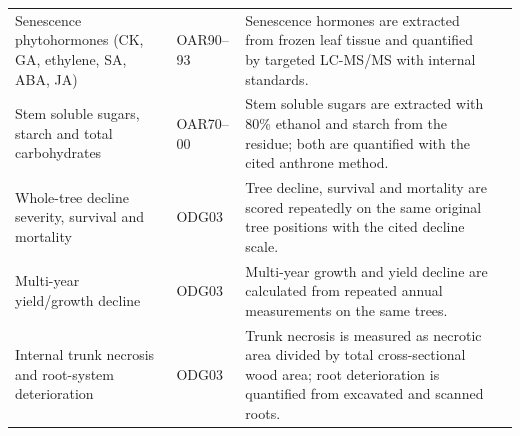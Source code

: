 \begin{landscape}
\begin{longtable}{>{\RaggedRight\arraybackslash}p{5.1cm} >{\RaggedRight\arraybackslash}p{2.3cm} >{\RaggedRight\arraybackslash}p{16.7cm} >{\RaggedRight\arraybackslash}p{2.4cm}}
Senescence phytohormones (CK, GA, ethylene, SA, ABA, JA) &
OAR90--93 &
Senescence hormones are extracted from frozen leaf tissue and quantified by targeted LC-MS/MS with internal standards. &
\citep{milyaev2022}\\

Stem soluble sugars, starch and total carbohydrates &
OAR70--00 &
Stem soluble sugars are extracted with 80\% ethanol and starch from the residue; both are quantified with the cited anthrone method. &
\citep{sivaci2006,sydney_anthrone}\\

Whole-tree decline severity, survival and mortality &
ODG03 &
Tree decline, survival and mortality are scored repeatedly on the same original tree positions with the cited decline scale. &
\citep{wunsch2024,lawrence2025}\\

Multi-year yield/growth decline &
ODG03 &
Multi-year growth and yield decline are calculated from repeated annual measurements on the same trees. &
\citep{plavcova2022,lawrence2025}\\

Internal trunk necrosis and root-system deterioration &
ODG03 &
Trunk necrosis is measured as necrotic area divided by total cross-sectional wood area; root deterioration is quantified from excavated and scanned roots. &
\citep{serrano2023}\\

\end{longtable}
\endgroup
\end{landscape}
